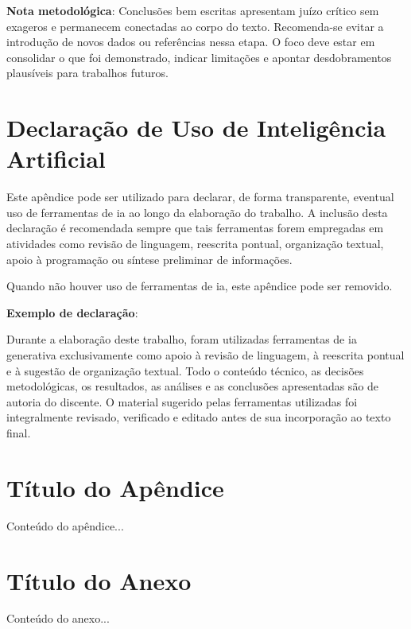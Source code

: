 \documentclass{eic-bcc-tcc}
\begin{document}
\textbf{Nota metodológica}: Conclusões bem escritas apresentam juízo crítico sem exageros e permanecem conectadas ao corpo do texto. Recomenda-se evitar a introdução de novos dados ou referências nessa etapa. O foco deve estar em consolidar o que foi demonstrado, indicar limitações e apontar desdobramentos plausíveis para trabalhos futuros.




\backmatter


\appendix
\chapter{Declaração de Uso de Inteligência Artificial}

Este apêndice pode ser utilizado para declarar, de forma transparente, eventual uso de ferramentas de \gls{ia} ao longo da elaboração do trabalho. A inclusão desta declaração é recomendada sempre que tais ferramentas forem empregadas em atividades como revisão de linguagem, reescrita pontual, organização textual, apoio à programação ou síntese preliminar de informações.

Quando não houver uso de ferramentas de \gls{ia}, este apêndice pode ser removido.

\textbf{Exemplo de declaração}:

Durante a elaboração deste trabalho, foram utilizadas ferramentas de \gls{ia} generativa exclusivamente como apoio à revisão de linguagem, à reescrita pontual e à sugestão de organização textual. Todo o conteúdo técnico, as decisões metodológicas, os resultados, as análises e as conclusões apresentadas são de autoria do discente. O material sugerido pelas ferramentas utilizadas foi integralmente revisado, verificado e editado antes de sua incorporação ao texto final.

\chapter{Título do Apêndice}
Conteúdo do apêndice...

\anexos
\chapter{Título do Anexo}
Conteúdo do anexo...
\end{document}
